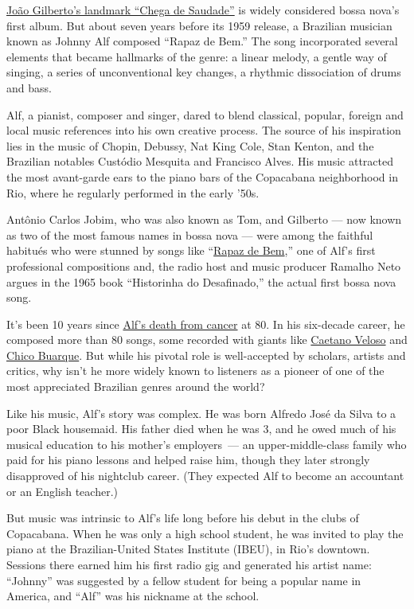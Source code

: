 \href{https://www.youtube.com/watch?v=Zt6JuURjuzg}{João Gilberto's
landmark ``Chega de Saudade''} is widely considered bossa nova's first
album. But about seven years before its 1959 release, a Brazilian
musician known as Johnny Alf composed ``Rapaz de Bem.'' The song
incorporated several elements that became hallmarks of the genre: a
linear melody, a gentle way of singing, a series of unconventional key
changes, a rhythmic dissociation of drums and bass.

Alf, a pianist, composer and singer, dared to blend classical, popular,
foreign and local music references into his own creative process. The
source of his inspiration lies in the music of Chopin, Debussy, Nat King
Cole, Stan Kenton, and the Brazilian notables Custódio Mesquita and
Francisco Alves. His music attracted the most avant-garde ears to the
piano bars of the Copacabana neighborhood in Rio, where he regularly
performed in the early '50s.

Antônio Carlos Jobim, who was also known as Tom, and Gilberto --- now
known as two of the most famous names in bossa nova --- were among the
faithful habitués who were stunned by songs like
``\href{https://www.youtube.com/watch?v=c0rJQ02Fjyo}{Rapaz de Bem},''
one of Alf's first professional compositions and, the radio host and
music producer Ramalho Neto argues in the 1965 book ``Historinha do
Desafinado,'' the actual first bossa nova song.

It's been 10 years since
\href{https://www.nytimes.com/2010/03/12/arts/music/12alf.html}{Alf's
death from cancer} at 80. In his six-decade career, he composed more
than 80 songs, some recorded with giants like
\href{https://www.youtube.com/watch?v=Sr20erfxSrk}{Caetano Veloso} and
\href{https://www.youtube.com/watch?v=Z9CfAkqVKvs}{Chico Buarque}. But
while his pivotal role is well-accepted by scholars, artists and
critics, why isn't he more widely known to listeners as a pioneer of one
of the most appreciated Brazilian genres around the world?

Like his music, Alf's story was complex. He was born Alfredo José da
Silva to a poor Black housemaid. His father died when he was 3, and he
owed much of his musical education to his mother's employers~--- an
upper-middle-class family who paid for his piano lessons and helped
raise him, though they later strongly disapproved of his nightclub
career. (They expected Alf to become an accountant or an English
teacher.)

But music was intrinsic to Alf's life long before his debut in the clubs
of Copacabana. When he was only a high school student, he was invited to
play the piano at the Brazilian-United States Institute (IBEU), in Rio's
downtown. Sessions there earned him his first radio gig and generated
his artist name: ``Johnny'' was suggested by a fellow student for being
a popular name in America, and ``Alf'' was his nickname at the school.

